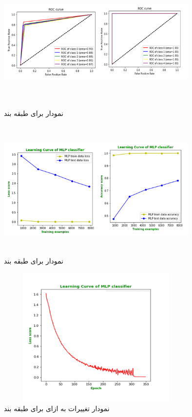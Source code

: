 \documentclass[12pt,onecolumn,a4paper]{article}
\begin{document}
\begin{figure}
  \centering
  \includegraphics[width=10cm,height=7cm,keepaspectratio]{15.png}
  \caption{نمودار  برای طبقه بند }
  \label{fig:ROCMLP}
\end{figure}

\begin{figure}
  \centering
  \includegraphics[width=10cm,height=7cm,keepaspectratio]{16.png}
  \caption{نمودار  برای طبقه بند }
  \label{fig:LCMLP}
\end{figure}

\begin{figure}
  \centering
  \includegraphics[width=10cm,height=7cm,keepaspectratio]{17.png}
  \caption{نمودار تغییرات  به ازای  برای طبقه بند }
  \label{fig:LossMLP}
\end{figure}
\end{document}
